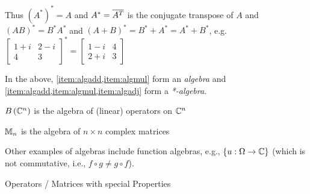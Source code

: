 \begin{enumerate}[label=\arabic*)]
          Thus $(A^*)^* = A$ and $A^* = \overline{A^T}$ is the conjugate transpose of $A$ and
          $(AB)^* = B^*A^*$ and $(A + B)^* = B^* + A^* = A^* + B^*$, e.g. $\begin{bmatrix}1 + i & 2 - i\\4 & 3\end{bmatrix}^* = \begin{bmatrix}1 - i & 4\\2 + i & 3\end{bmatrix}$
\end{enumerate}

In the above, \cref{item:algadd,item:algmul} form an \emph{algebra} and
\cref{item:algadd,item:algmul,item:algadj} form a \emph{*-algebra}.

$B\left(\mathbb{C}^n\right)$ is the algebra of (linear) operators on $\mathbb{C}^n$

$\mathbb{M}_n$ is the algebra of $n\times n$ complex matrices

Other examples of algebras include function algebras, e.g., $\left\lbrace u:\Omega \to \mathbb{C}\right\rbrace$
(which is not commutative, i.e., $f\circ g \neq g\circ f$).

Operators / Matrices with special Properties

